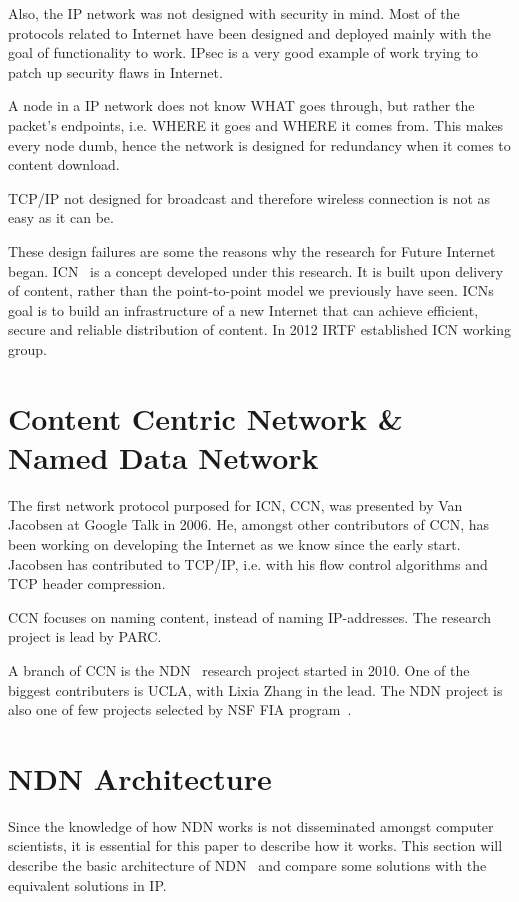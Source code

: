 Also, the \gls{IP} network was not designed with security in mind. 
Most of the protocols related to Internet have been designed and deployed mainly with the goal of functionality to work.
\gls{IPsec} is a very good example of work trying to patch up security flaws in Internet.

A node in a \gls{IP} network does not know WHAT goes through, but rather the packet's endpoints, i.e. WHERE it goes and WHERE it comes from. 
This makes every node dumb, hence the network is designed for redundancy when it comes to content download.

\gls{TCP}/\gls{IP} not designed for broadcast and therefore wireless connection is not as easy as it can be.

These design failures are some the reasons why the research for Future Internet began.  
\gls{ICN}~\cite{DBLP:journals/cm/AhlgrenDIKO12} is a concept developed under this research.
It is built upon delivery of content, rather than the point-to-point model we previously have seen.
\gls{ICN}s goal is to build an infrastructure of a new Internet that can achieve efficient, secure and reliable distribution of content.
In 2012 \gls{IRTF} established \gls{ICN} working group.


\section{Content Centric Network \& Named Data Network}\label{chp2:sec:icn}
The first network protocol purposed for \gls{ICN}, \gls{CCN}, was presented by Van Jacobsen at Google Talk in 2006. 
He, amongst other contributors of \gls{CCN}, has been working on developing the Internet as we know since the early start.
Jacobsen has contributed to \gls{TCP}/\gls{IP}, i.e. with his flow control algorithms and \gls{TCP} header compression. 

\gls{CCN} focuses on naming content, instead of naming \gls{IP}-addresses. 
The research project is lead by \gls{PARC}.

A branch of \gls{CCN} is the \gls{NDN}~\cite{DBLP:journals/ccr/0001ABJcCPWZ14} research project started in 2010.
One of the biggest contributers is \gls{UCLA}, with Lixia Zhang in the lead. 
The \gls{NDN} project is also one of few projects selected by \gls{NSF} \gls{FIA} program~\cite{nsf-fia}.

\section{NDN Architecture}\label{chp2:sec:ndn_architecture}
Since the knowledge of how \gls{NDN} works is not disseminated amongst computer scientists, it is essential for this paper to describe how it works.
This section will describe the basic architecture of \gls{NDN}~\cite{NDN-0021} and compare some solutions with the equivalent solutions in \gls{IP}.

